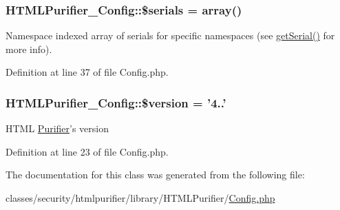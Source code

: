 \hypertarget{classHTMLPurifier__Config_afe003339baa3446423bde92d230c1333}{
\subsubsection[{\$serials}]{\setlength{\rightskip}{0pt plus 5cm}H\+T\+M\+L\+Purifier\+\_\+\+Config\+::\$serials = array()\hspace{0.3cm}{\ttfamily [protected]}}}\label{classHTMLPurifier__Config_afe003339baa3446423bde92d230c1333}
Namespace indexed array of serials for specific namespaces (see \hyperlink{classHTMLPurifier__Config_af8bf913306ef7f975c0eb02686272f06}{get\+Serial()} for more info). 

Definition at line 37 of file Config.\+php.

\hypertarget{classHTMLPurifier__Config_a90113c09843f976f69f37031f7eb9023}{
\subsubsection[{\$version}]{\setlength{\rightskip}{0pt plus 5cm}H\+T\+M\+L\+Purifier\+\_\+\+Config\+::\$version = '4..'}}\label{classHTMLPurifier__Config_a90113c09843f976f69f37031f7eb9023}
H\+T\+M\+L \hyperlink{classPurifier}{Purifier}'s version 

Definition at line 23 of file Config.\+php.



The documentation for this class was generated from the following file\+:\begin{DoxyCompactItemize}
\item 
classes/security/htmlpurifier/library/\+H\+T\+M\+L\+Purifier/\hyperlink{Config_8php}{Config.\+php}\end{DoxyCompactItemize}
